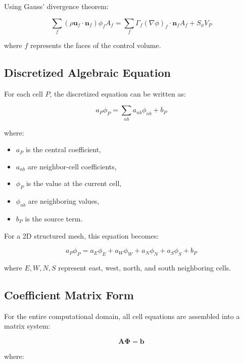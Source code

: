 \documentclass[12pt,a4paper]{article}
\begin{document}
Using Gauss' divergence theorem:

\begin{equation}
    \sum_f\left(\rho \bm{u}_f \cdot \bm{n}_f \right) \phi_f A_f = \sum_f \Gamma_f \left( \nabla \phi \right)_f\cdot \bm{n}_f A_f + S_{\phi}V_P
\end{equation}

where \(f\) represents the faces of the control volume.

\subsection{Discretized Algebraic Equation}

For each cell \(P\), the discretized equation can be written as:

\begin{equation}
    a_P \phi_P = \sum_{nb} a_{nb}\phi_{nb} + b_P
\end{equation}

where:
\begin{itemize}
    \item \(a_P\) is the central coefficient,
    \item \(a_{nb}\) are neighbor-cell coefficients,
    \item \(\phi_P\) is the value at the current cell,
    \item \(\phi_{nb}\) are neighboring values,
    \item \(b_P\) is the source term.
\end{itemize}

For a 2D structured mesh, this equation becomes:

\begin{equation}
    a_P\phi_P = a_E\phi_E + a_W\phi_W + a_N\phi_N + a_S\phi_S + b_P
\end{equation}

where \(E,W,N,S\) represent east, west, north, and south neighboring cells.

\subsection{Coefficient Matrix Form}

For the entire computational domain, all cell equations are assembled into a matrix system:

\begin{equation}
    \bm{A}\bm{\Phi} = \bm{b}
\end{equation}

where:
\end{document}
